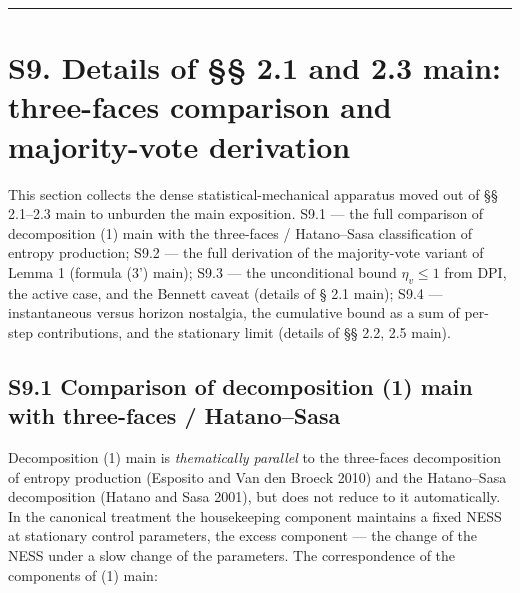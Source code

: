 \documentclass[pdflatex,sn-mathphys-ay]{sn-jnl}
\begin{document}
\begin{center}\rule{0.5\linewidth}{0.5pt}\end{center}



\section*{S9. Details of §§ 2.1 and 2.3 main: three-faces comparison and majority-vote derivation}\label{s9.-details-of-2.1-and-2.3-main-three-faces-comparison-and-majority-vote-derivation}



This section collects the dense statistical-mechanical apparatus moved out of §§ 2.1--2.3 main to unburden the main exposition. S9.1 --- the full comparison of decomposition (1) main with the three-faces / Hatano--Sasa classification of entropy production; S9.2 --- the full derivation of the majority-vote variant of Lemma 1 (formula (3') main); S9.3 --- the unconditional bound \(\eta_v \le 1\) from DPI, the active case, and the Bennett caveat (details of § 2.1 main); S9.4 --- instantaneous versus horizon nostalgia, the cumulative bound as a sum of per-step contributions, and the stationary limit (details of §§ 2.2, 2.5 main).



\subsection*{S9.1 Comparison of decomposition (1) main with three-faces / Hatano--Sasa}\label{s9.1-comparison-of-decomposition-1-main-with-three-faces-hatanosasa}



Decomposition (1) main is \emph{thematically parallel} to the three-faces decomposition of entropy production (Esposito and Van den Broeck 2010) and the Hatano--Sasa decomposition (Hatano and Sasa 2001), but does not reduce to it automatically. In the canonical treatment the housekeeping component maintains a fixed NESS at stationary control parameters, the excess component --- the change of the NESS under a slow change of the parameters. The correspondence of the components of (1) main:
\end{document}
